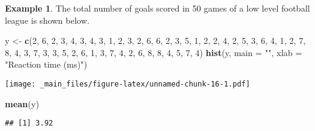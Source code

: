 \documentclass[
]{book}
\newenvironment{Shaded}{\begin{snugshade}}{\end{snugshade}}
\newcommand{\AttributeTok}[1]{\textcolor[rgb]{0.13,0.29,0.53}{#1}}
\newcommand{\DecValTok}[1]{\textcolor[rgb]{0.00,0.00,0.81}{#1}}
\newcommand{\FunctionTok}[1]{\textcolor[rgb]{0.13,0.29,0.53}{\textbf{#1}}}
\newcommand{\NormalTok}[1]{#1}
\newcommand{\OtherTok}[1]{\textcolor[rgb]{0.56,0.35,0.01}{#1}}
\newcommand{\StringTok}[1]{\textcolor[rgb]{0.31,0.60,0.02}{#1}}
\theoremstyle{definition}
\theoremstyle{definition}
\newtheorem{example}{Example}[chapter]
\theoremstyle{definition}
\theoremstyle{definition}
\theoremstyle{remark}
\begin{document}
\begin{example}
The total number of goals scored in 50 games of a low level football league is shown below.

\begin{Shaded}
\begin{Highlighting}[]
\NormalTok{y }\OtherTok{\textless{}{-}} \FunctionTok{c}\NormalTok{(}\DecValTok{2}\NormalTok{, }\DecValTok{6}\NormalTok{, }\DecValTok{2}\NormalTok{, }\DecValTok{3}\NormalTok{, }\DecValTok{4}\NormalTok{, }\DecValTok{3}\NormalTok{, }\DecValTok{4}\NormalTok{, }\DecValTok{3}\NormalTok{, }\DecValTok{1}\NormalTok{, }\DecValTok{2}\NormalTok{, }\DecValTok{3}\NormalTok{, }\DecValTok{2}\NormalTok{, }\DecValTok{6}\NormalTok{, }\DecValTok{6}\NormalTok{, }\DecValTok{2}\NormalTok{, }\DecValTok{3}\NormalTok{, }\DecValTok{5}\NormalTok{, }\DecValTok{1}\NormalTok{, }\DecValTok{2}\NormalTok{, }\DecValTok{2}\NormalTok{, }\DecValTok{4}\NormalTok{, }\DecValTok{2}\NormalTok{, }\DecValTok{5}\NormalTok{, }\DecValTok{3}\NormalTok{,}
       \DecValTok{6}\NormalTok{, }\DecValTok{4}\NormalTok{, }\DecValTok{1}\NormalTok{, }\DecValTok{2}\NormalTok{, }\DecValTok{7}\NormalTok{, }\DecValTok{8}\NormalTok{, }\DecValTok{4}\NormalTok{, }\DecValTok{3}\NormalTok{, }\DecValTok{7}\NormalTok{, }\DecValTok{3}\NormalTok{, }\DecValTok{3}\NormalTok{, }\DecValTok{5}\NormalTok{, }\DecValTok{2}\NormalTok{, }\DecValTok{6}\NormalTok{, }\DecValTok{1}\NormalTok{, }\DecValTok{3}\NormalTok{, }\DecValTok{7}\NormalTok{, }\DecValTok{4}\NormalTok{, }\DecValTok{2}\NormalTok{, }\DecValTok{6}\NormalTok{, }\DecValTok{8}\NormalTok{, }\DecValTok{8}\NormalTok{, }\DecValTok{4}\NormalTok{, }\DecValTok{5}\NormalTok{,}
       \DecValTok{7}\NormalTok{, }\DecValTok{4}\NormalTok{)}
\FunctionTok{hist}\NormalTok{(y, }\AttributeTok{main =} \StringTok{""}\NormalTok{, }\AttributeTok{xlab =} \StringTok{"Reaction time (ms)"}\NormalTok{)}
\end{Highlighting}
\end{Shaded}

\texttt{[image: \_main\_files/figure-latex/unnamed-chunk-16-1.pdf]}

\begin{Shaded}
\begin{Highlighting}[]
\FunctionTok{mean}\NormalTok{(y)}
\end{Highlighting}
\end{Shaded}

\begin{verbatim}
## [1] 3.92
\end{verbatim}


\end{example}
\end{document}
